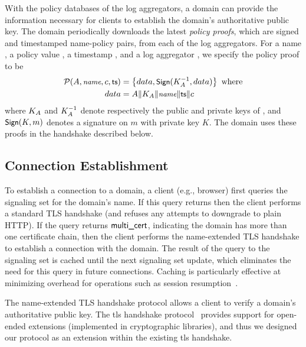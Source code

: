 With the policy databases of the log aggregators, a domain can provide the
information necessary for clients to establish the domain's authoritative public
key. The domain periodically downloads the latest \emph{policy proofs}, which
are signed and timestamped name-policy pairs, from each of the log aggregators.
For a name \hostname, a policy value \policy, a timestamp \timestamp, and a log
aggregator \logagg, we specify the policy proof to be
\begin{align}
  \mathcal{P}(A, \small{\emph{name}}, c, \textsf{ts}) &= 
  \left\{data, \small{\textsf{Sign}}(K_{A}^{-1}, data)\right\} \mbox{ where}
  \nonumber \\
  data &= A \| K_{A} \| \small{\emph{name}} \| \textsf{ts} \| c
\end{align}
where $K_{A}$ and $K_{A}^{-1}$ denote respectively the public
and private keys of \logagg, and $\small{\textsf{Sign}}(K, m)$ denotes a signature on $m$
with private key $K$. The domain uses these proofs in the handshake described
below.

\subsection{Connection Establishment}
\label{sec:design:handshake}

To establish a connection to a domain, a client (e.g., browser) first queries
the signaling set for the domain's name. If this query returns \onecert then the
client performs a standard TLS handshake (and refuses any attempts to downgrade
to plain HTTP). If the query returns $\textsf{multi\_cert}$, indicating the domain has
more than one certificate chain, then the client performs the \ac{name}-extended
TLS handshake to establish a connection with the domain. The result of the query
to the signaling set is cached until the next signaling set update, which
eliminates the need for this query in future connections. Caching is
particularly effective at minimizing overhead for operations such as session
resumption~\cite{rfc8446}.

The \ac{name}-extended TLS handshake protocol allows a client to verify a
domain's authoritative public key. The \ac{tls} handshake
protocol~\cite{rfc5246} provides support for open-ended extensions (implemented
in cryptographic libraries), and thus we designed our protocol as an extension
within the existing \ac{tls} handshake.

